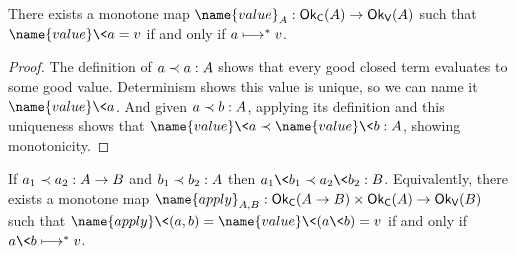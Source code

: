 
\begin{lemma}\label{lemma-closed-term-evaluation}
  There exists a monotone map $\name{value}_A : \goodclosed A \to \goodvalue A$ such that $\name{value}\<a = v$ if and only if $a \evalsto v$.
\end{lemma}

\begin{proof}
  The definition of $\oplrclosed A a a$ shows that every good closed term evaluates to some good value. Determinism shows this value is unique, so we can name it $\name{value}\<a$. And given $\oplrclosed A a b$, applying its definition and this uniqueness shows that $\oplrvalue A {\name{value}\<a} {\name{value}\<b}$, showing monotonicity.
\end{proof}

\begin{lemma}\label{lemma-closed-term-application}
  If $\oplrclosed{A \to B}{a_1}{a_2}$ and $\oplrclosed A {b_1}{b_2}$ then $\oplrclosed B {a_1\<b_1} {a_2\<b_2}$.
%
  Equivalently, there exists a monotone map $\name{apply}_{A,B} : \goodclosed{A \to B} \times \goodclosed A \to \goodvalue B$ such that $\name{apply}\<(a,b) = \name{value}\<(a\<b) = v$ if and only if $a\<b \evalsto v$.
\end{lemma}

